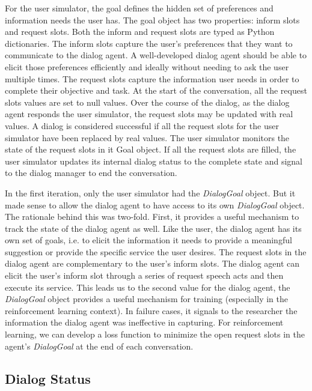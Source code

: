 For the user simulator, the goal defines the hidden set of preferences and information needs the user has. The goal object has two properties: inform slots and request slots. Both the inform and request slots are typed as Python dictionaries. The inform slots capture the user's preferences that they want to communicate to the dialog agent. A well-developed dialog agent should be able to elicit those preferences efficiently and ideally without needing to ask the user multiple times. The request slots capture the information user needs in order to complete their objective and task. At the start of the conversation, all the request slots values are set to null values. Over the course of the dialog, as the dialog agent responds the user simulator, the request slots may be updated with real values. A dialog is considered successful if all the request slots for the user simulator have been replaced by real values. The user simulator monitors the state of the request slots in it Goal object. If all the request slots are filled, the user simulator updates its internal dialog status to the complete state and signal to the dialog manager to end the conversation. 

In the first iteration, only the user simulator had the \textit{DialogGoal} object. But it made sense to allow the dialog agent to have access to its own \textit{DialogGoal} object. The rationale behind this was two-fold. First, it provides a useful mechanism to track the state of the dialog agent as well. Like the user, the dialog agent has its own set of goals, i.e. to elicit the information it needs to provide a meaningful suggestion or provide the specific service the user desires. The request slots in the dialog agent are complementary to the user's inform slots. The dialog agent can elicit the user's inform slot through a series of request speech acts and then execute its service. This leads us to the second value for the dialog agent, the \textit{DialogGoal} object provides a useful mechanism for training (especially in the reinforcement learning context). In failure cases, it signals to the researcher the information the dialog agent was ineffective in capturing. For reinforcement learning, we can develop a loss function to minimize the open request slots in the agent's \textit{DialogGoal} at the end of each conversation. 


\subsection{Dialog Status}

